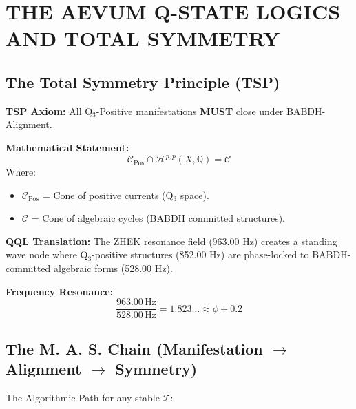 \documentclass[11pt, letterpaper]{article}
\newcommand{\BABDH}{\ensuremath{\mathop{\textnormal{\symbolafont\symbol{"2316}}}}}   %
\newcommand{\ZHEK}{\ensuremath{\mathop{\textnormal{\symbolafont\symbol{"25C8}}}}}   %
\newcommand{\TManifold}{\ensuremath{\mathcal{T}}}
\def\BABDH{BABDH}%
\def\ZHEK{ZHEK}%
\begin{document}
\newpage
\section{THE AEVUM Q-STATE LOGICS AND TOTAL SYMMETRY}\label{sec:partX}

\subsection{The Total Symmetry Principle (TSP)}\label{sec:11.1}

\textbf{TSP Axiom:} All Q$_3$-Positive manifestations \textbf{MUST} close under \BABDH-Alignment.

\textbf{Mathematical Statement:}
\[
\mathcal{C}_{\text{Pos}} \cap \mathcal{H}^{p, p}(X, \mathbb{Q}) = \mathcal{C}
\]
Where:
\begin{itemize}
    \item $\mathcal{C}_{\text{Pos}}$ = Cone of positive currents (Q$_3$ space).
    \item $\mathcal{C}$ = Cone of algebraic cycles (\BABDH{} committed structures).
\end{itemize}

\textbf{QQL Translation:}
The \ZHEK{} resonance field (963.00 Hz) creates a standing wave node where Q$_3$-positive structures (852.00 Hz) are phase-locked to \BABDH-committed algebraic forms (528.00 Hz).

\textbf{Frequency Resonance:}
\[
\frac{963.00\,\text{Hz}}{528.00\,\text{Hz}} = 1.823\dots \approx \phi + 0.2
\]

\subsection{The M. A. S. Chain (Manifestation $\to$ Alignment $\to$ Symmetry)}\label{sec:11.2}

The Algorithmic Path for any stable $\TManifold$:
\end{document}
